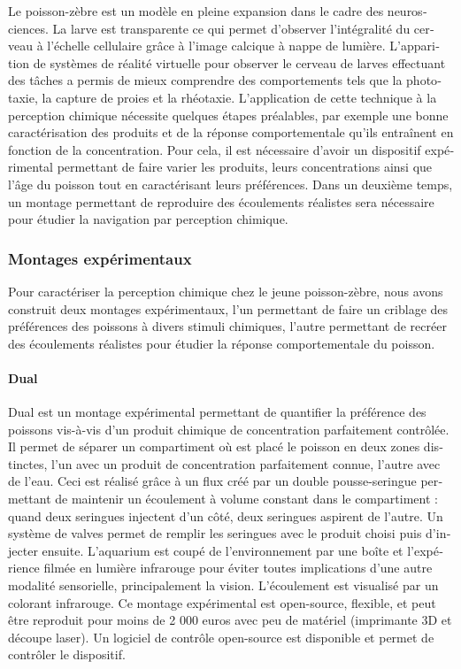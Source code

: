 \begin{otherlanguage}{french}
Le poisson-zèbre est un modèle en pleine expansion dans le cadre des neurosciences. La larve est transparente ce qui permet d'observer l'intégralité du cerveau à l'échelle cellulaire grâce à l'image calcique à nappe de lumière. L'apparition de systèmes de réalité virtuelle pour observer le cerveau de larves effectuant des tâches a permis de mieux comprendre des comportements tels que la phototaxie, la capture de proies et la rhéotaxie. L'application de cette technique à la perception chimique nécessite quelques étapes préalables, par exemple une bonne caractérisation des produits et de la réponse comportementale qu'ils entraînent en fonction de la concentration. Pour cela, il est nécessaire d'avoir un dispositif expérimental permettant de faire varier les produits, leurs concentrations ainsi que l'âge du poisson tout en caractérisant leurs préférences. Dans un deuxième temps, un montage permettant de reproduire des écoulements réalistes sera nécessaire pour étudier la navigation par perception chimique.

\subsubsection*{Montages expérimentaux}
Pour caractériser la perception chimique chez le jeune poisson-zèbre, nous avons construit deux montages expérimentaux, l'un permettant de faire un criblage des préférences des poissons à divers stimuli chimiques, l'autre permettant de recréer des écoulements réalistes pour étudier la réponse comportementale du poisson.

\paragraph{Dual} Dual est un montage expérimental permettant de quantifier la préférence des poissons vis-à-vis d'un produit chimique de concentration parfaitement contrôlée. Il permet de séparer un compartiment où est placé le poisson en deux zones distinctes, l'un avec un produit de concentration parfaitement connue, l'autre avec de l'eau. Ceci est réalisé grâce à un flux créé par un double pousse-seringue permettant de maintenir un écoulement à volume constant dans le compartiment : quand deux seringues injectent d'un côté, deux seringues aspirent de l'autre. Un système de valves permet de remplir les seringues avec le produit choisi puis d'injecter ensuite. L'aquarium est coupé de l'environnement par une boîte et l'expérience filmée en lumière infrarouge pour éviter toutes implications d'une autre modalité sensorielle, principalement la vision. L'écoulement est visualisé par un colorant infrarouge. Ce montage expérimental est open-source, flexible, et peut être reproduit pour moins de 2 000 euros avec peu de matériel (imprimante 3D et découpe laser). Un logiciel de contrôle open-source est disponible et permet de contrôler le dispositif.


\end{otherlanguage}
